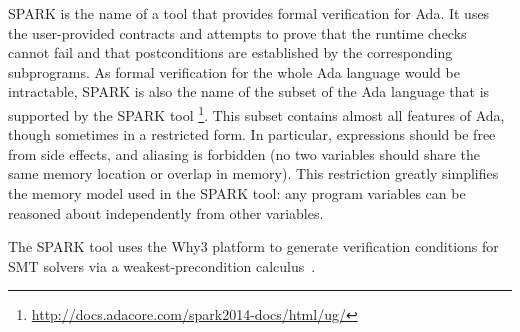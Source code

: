 \documentclass[runningheads]{llncs}
\begin{document}

SPARK is the name of a tool that provides formal verification for Ada. It uses the user-provided contracts and attempts to prove that the runtime checks cannot fail and that postconditions are established by the corresponding subprograms.
As formal verification for the whole Ada language would be intractable, SPARK is also the name of the subset of the Ada language that is supported by the SPARK tool%
\footnote{\url{http://docs.adacore.com/spark2014-docs/html/ug/}}.
This subset contains almost all features of Ada, though sometimes in a restricted form. %
In particular, expressions should be free from side effects, and aliasing is forbidden (no two variables should share the same memory location or overlap in memory).
This restriction greatly simplifies the memory model used in the SPARK tool: any program variables%
can be reasoned about independently from other variables.

The SPARK tool %
uses the Why3 platform to generate verification conditions for SMT solvers via a weakest-precondition calculus~\cite{bobot2011why3}.
\end{document}
